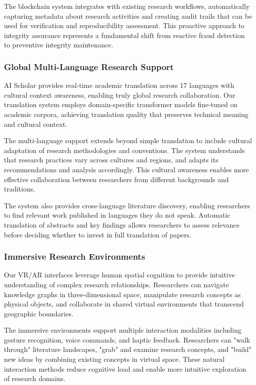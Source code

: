 \documentclass[10pt,twocolumn]{article}
\begin{document}
The blockchain system integrates with existing research workflows, automatically capturing metadata about research activities and creating audit trails that can be used for verification and reproducibility assessment. This proactive approach to integrity assurance represents a fundamental shift from reactive fraud detection to preventive integrity maintenance.

\subsubsection{Global Multi-Language Research Support}

AI Scholar provides real-time academic translation across 17 languages with cultural context awareness, enabling truly global research collaboration. Our translation system employs domain-specific transformer models fine-tuned on academic corpora, achieving translation quality that preserves technical meaning and cultural context.

The multi-language support extends beyond simple translation to include cultural adaptation of research methodologies and conventions. The system understands that research practices vary across cultures and regions, and adapts its recommendations and analysis accordingly. This cultural awareness enables more effective collaboration between researchers from different backgrounds and traditions.

The system also provides cross-language literature discovery, enabling researchers to find relevant work published in languages they do not speak. Automatic translation of abstracts and key findings allows researchers to assess relevance before deciding whether to invest in full translation of papers.

\subsubsection{Immersive Research Environments}

Our VR/AR interfaces leverage human spatial cognition to provide intuitive understanding of complex research relationships. Researchers can navigate knowledge graphs in three-dimensional space, manipulate research concepts as physical objects, and collaborate in shared virtual environments that transcend geographic boundaries.

The immersive environments support multiple interaction modalities including gesture recognition, voice commands, and haptic feedback. Researchers can "walk through" literature landscapes, "grab" and examine research concepts, and "build" new ideas by combining existing concepts in virtual space. These natural interaction methods reduce cognitive load and enable more intuitive exploration of research domains.
\end{document}
